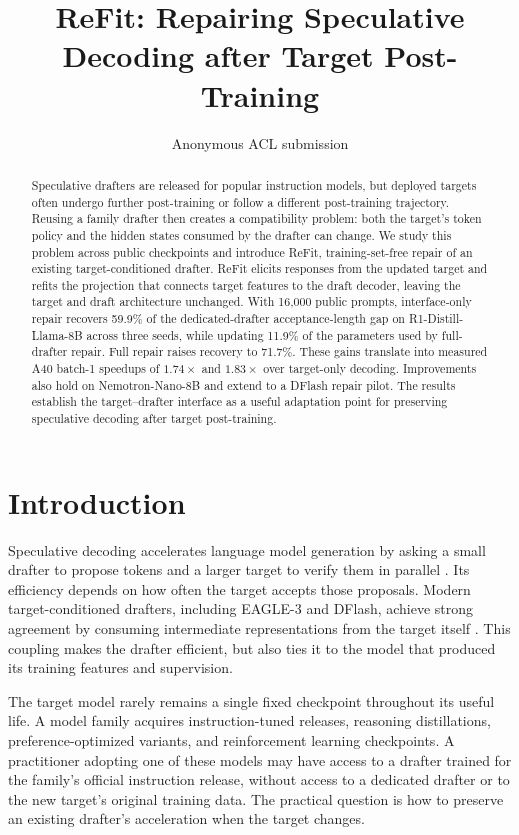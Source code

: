 \documentclass[11pt]{article}
\title{ReFit: Repairing Speculative Decoding after Target Post-Training}
\author{Anonymous ACL submission}
\newcommand{\method}{ReFit}
\begin{document}
\maketitle

\begin{abstract}
Speculative drafters are released for popular instruction models, but deployed targets often undergo further post-training or follow a different post-training trajectory. Reusing a family drafter then creates a compatibility problem: both the target's token policy and the hidden states consumed by the drafter can change. We study this problem across public checkpoints and introduce \method{}, training-set-free repair of an existing target-conditioned drafter. \method{} elicits responses from the updated target and refits the projection that connects target features to the draft decoder, leaving the target and draft architecture unchanged. With 16,000 public prompts, interface-only repair recovers 59.9\% of the dedicated-drafter acceptance-length gap on R1-Distill-Llama-8B across three seeds, while updating 11.9\% of the parameters used by full-drafter repair. Full repair raises recovery to 71.7\%. These gains translate into measured A40 batch-1 speedups of $1.74\times$ and $1.83\times$ over target-only decoding. Improvements also hold on Nemotron-Nano-8B and extend to a DFlash repair pilot. The results establish the target--drafter interface as a useful adaptation point for preserving speculative decoding after target post-training.
\end{abstract}

\section{Introduction}
Speculative decoding accelerates language model generation by asking a small drafter to propose tokens and a larger target to verify them in parallel \citep{leviathan2023,chen2023}. Its efficiency depends on how often the target accepts those proposals. Modern target-conditioned drafters, including EAGLE-3 and DFlash, achieve strong agreement by consuming intermediate representations from the target itself \citep{eagle32025,dflash2026}. This coupling makes the drafter efficient, but also ties it to the model that produced its training features and supervision.

The target model rarely remains a single fixed checkpoint throughout its useful life. A model family acquires instruction-tuned releases, reasoning distillations, preference-optimized variants, and reinforcement learning checkpoints. A practitioner adopting one of these models may have access to a drafter trained for the family's official instruction release, without access to a dedicated drafter or to the new target's original training data. The practical question is how to preserve an existing drafter's acceleration when the target changes.
\end{document}
